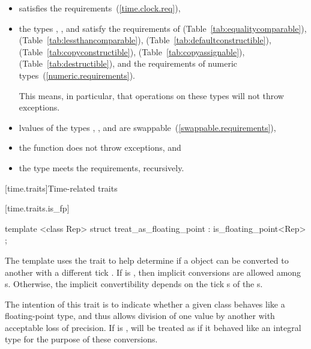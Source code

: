 \begin{itemize}
\item {} satisfies the  requirements~(\ref{time.clock.req}),

\item the types , , and 
satisfy the requirements of  (Table~\ref{tab:equalitycomparable}),
 (Table~\ref{tab:lessthancomparable}),
 (Table~\ref{tab:defaultconstructible}),
 (Table~\ref{tab:copyconstructible}),
 (Table~\ref{tab:copyassignable}),
 (Table~\ref{tab:destructible}), and the requirements of
numeric types~(\ref{numeric.requirements}). \begin{note} This means, in particular,
that operations on these types will not throw exceptions. \end{note}

\item lvalues of the types , , and
 are swappable~(\ref{swappable.requirements}),

\item the function  does not throw exceptions, and

\item the type  meets the 
requirements, recursively.
\end{itemize}

[time.traits]{Time-related traits}

[time.traits.is_fp]{}

%
\begin{itemdecl}
template <class Rep> struct treat_as_floating_point
  : is_floating_point<Rep> { };
\end{itemdecl}

\pnum
The  template uses the  trait to
help determine if a  object can be converted to another
 with a different tick . If
 is , then implicit conversions
are allowed among s. Otherwise, the implicit convertibility
depends on the tick s of the s.
\begin{note}
The intention of this trait is to indicate whether a given class behaves like a floating-point
type, and thus allows division of one value by another with acceptable loss of precision. If
 is ,  will be treated as
if it behaved like an integral type for the purpose of these conversions.
\end{note}

